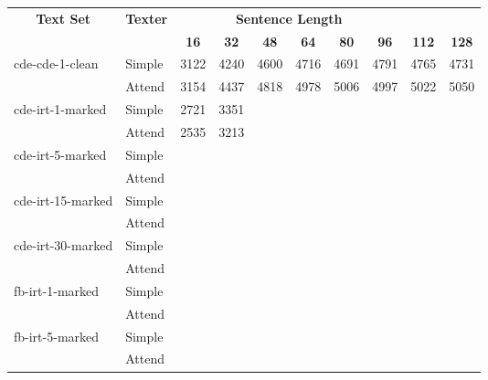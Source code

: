 \begin{tabular}{| l | l | r | r | r | r | r | r | r | r |}
    \hline

    \multicolumn{1}{|c|}{\multirow{2}{*}{\textbf{Text Set}}} &
    \multicolumn{1}{|c|}{\multirow{2}{*}{\textbf{Texter}}} &
    \multicolumn{6}{|c|}{\textbf{Sentence Length}} \\

    &
    &
    \multicolumn{1}{|c|}{\textbf{16}} &
    \multicolumn{1}{|c|}{\textbf{32}} &
    \multicolumn{1}{|c|}{\textbf{48}} &
    \multicolumn{1}{|c|}{\textbf{64}} &
    \multicolumn{1}{|c|}{\textbf{80}} &
    \multicolumn{1}{|c|}{\textbf{96}} &
    \multicolumn{1}{|c|}{\textbf{112}} &
    \multicolumn{1}{|c|}{\textbf{128}} \\

    \hline \hline

    \multirow{2}{*}{cde-cde-1-clean}
    & Simple & 3122 & 4240 & 4600 & 4716 & 4691 & 4791 & 4765 & 4731 \\
    & Attend & 3154 & 4437 & 4818 & 4978 & 5006 & 4997 & 5022 & 5050 \\ \hline

    \multirow{2}{*}{cde-irt-1-marked}
    & Simple & 2721 & 3351 &  &  &  &  &  &  \\
    & Attend & 2535 & 3213 &  &  &  &  &  &  \\ \hline

    \multirow{2}{*}{cde-irt-5-marked}
    & Simple &  &  &  &  &  &  &  &  \\
    & Attend &  &  &  &  &  &  &  &  \\ \hline

    \multirow{2}{*}{cde-irt-15-marked}
    & Simple &  &  &  &  &  &  &  &  \\
    & Attend &  &  &  &  &  &  &  &  \\ \hline

    \multirow{2}{*}{cde-irt-30-marked}
    & Simple &  &  &  &  &  &  &  &  \\
    & Attend &  &  &  &  &  &  &  &  \\ \hline \hline

    \multirow{2}{*}{fb-irt-1-marked}
    & Simple &  &  &  &  &  &  &  &  \\
    & Attend &  &  &  &  &  &  &  &  \\ \hline

    \multirow{2}{*}{fb-irt-5-marked}
    & Simple &  &  &  &  &  &  &  &  \\
    & Attend &  &  &  &  &  &  &  &  \\ \hline


\end{tabular}

